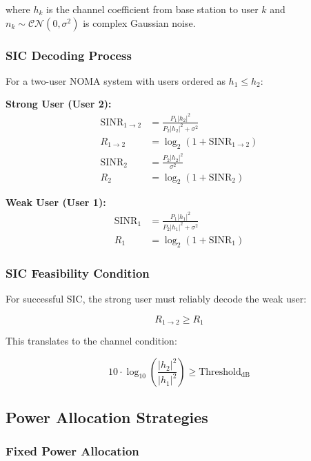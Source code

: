\documentclass[11pt,a4paper]{article}
\begin{document}
where $h_k$ is the channel coefficient from base station to user $k$ and $n_k \sim \mathcal{CN}(0, \sigma^2)$ is complex Gaussian noise.

\subsubsection{SIC Decoding Process}

For a two-user NOMA system with users ordered as $h_1 \leq h_2$:

\textbf{Strong User (User 2):}
\begin{align}
\text{SINR}_{1 \rightarrow 2} &= \frac{P_1|h_2|^2}{P_2|h_2|^2 + \sigma^2} \label{eq:sinr1_to_2} \\
R_{1 \rightarrow 2} &= \log_2(1 + \text{SINR}_{1 \rightarrow 2}) \\
\text{SINR}_2 &= \frac{P_2|h_2|^2}{\sigma^2} \label{eq:sinr2} \\
R_2 &= \log_2(1 + \text{SINR}_2)
\end{align}

\textbf{Weak User (User 1):}
\begin{align}
\text{SINR}_1 &= \frac{P_1|h_1|^2}{P_2|h_1|^2 + \sigma^2} \label{eq:sinr1} \\
R_1 &= \log_2(1 + \text{SINR}_1)
\end{align}

\subsubsection{SIC Feasibility Condition}

For successful SIC, the strong user must reliably decode the weak user:

\begin{equation}
R_{1 \rightarrow 2} \geq R_1
\end{equation}

This translates to the channel condition:

\begin{equation}
10 \cdot \log_{10}\left(\frac{|h_2|^2}{|h_1|^2}\right) \geq \text{Threshold}_{\text{dB}}
\end{equation}

\subsection{Power Allocation Strategies}

\subsubsection{Fixed Power Allocation}
\end{document}
